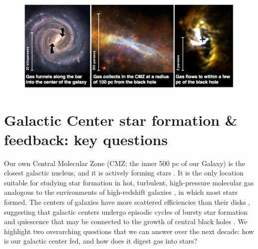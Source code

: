 \documentclass[modern]{aastex62}
\begin{document}
\vspace{-8mm}
\begin{figure}[htp]
    \includegraphics[width=1.0\textwidth]{BetsyColorFig.png}
\end{figure}

\clearpage

\section{Galactic Center star formation \& feedback: key questions}



Our own Central Molecular Zone (CMZ; the inner 500 pc of our Galaxy) is the
closest galactic nucleus, and it is actively forming stars \citep{Morris1996a}.
It is the only location suitable for studying star formation in hot, turbulent,
high-pressure  \citep{Ao2013a, Ginsburg2016a, Krieger2017a}
molecular gas analogous to the environments of high-redshift galaxies
\citep{Kruijssen2013a}, in which most stars formed. The centers of 
galaxies have more scattered efficiencies than their disks
\citep{Leroy2013a,Usero2015a,Bigiel2016a,Gallagher2018a}, suggesting that
galactic centers undergo episodic cycles of bursty star formation and quiescence
that may be connected to the growth of central black holes
\citep[e.g.,][]{Kruijssen2014c,Krumholz2017a,Torrey2017c,Seo2019a}.
We highlight two overarching questions that we can answer over the next decade:
how is our galactic center fed, and how does it digest gas into stars?
\end{document}
